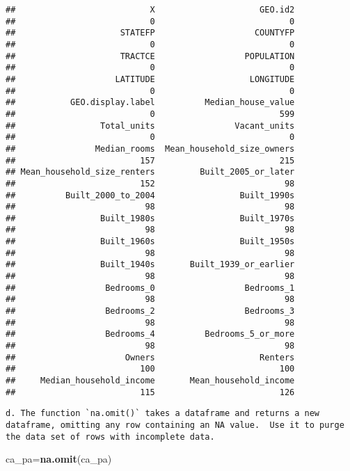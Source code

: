 \documentclass[
]{article}
\newenvironment{Shaded}{\begin{snugshade}}{\end{snugshade}}
\newcommand{\KeywordTok}[1]{\textcolor[rgb]{0.13,0.29,0.53}{\textbf{#1}}}
\newcommand{\NormalTok}[1]{#1}
\begin{document}
\begin{verbatim}
##                           X                     GEO.id2 
##                           0                           0 
##                     STATEFP                    COUNTYFP 
##                           0                           0 
##                     TRACTCE                  POPULATION 
##                           0                           0 
##                    LATITUDE                   LONGITUDE 
##                           0                           0 
##           GEO.display.label          Median_house_value 
##                           0                         599 
##                 Total_units                Vacant_units 
##                           0                           0 
##                Median_rooms  Mean_household_size_owners 
##                         157                         215 
## Mean_household_size_renters         Built_2005_or_later 
##                         152                          98 
##          Built_2000_to_2004                 Built_1990s 
##                          98                          98 
##                 Built_1980s                 Built_1970s 
##                          98                          98 
##                 Built_1960s                 Built_1950s 
##                          98                          98 
##                 Built_1940s       Built_1939_or_earlier 
##                          98                          98 
##                  Bedrooms_0                  Bedrooms_1 
##                          98                          98 
##                  Bedrooms_2                  Bedrooms_3 
##                          98                          98 
##                  Bedrooms_4          Bedrooms_5_or_more 
##                          98                          98 
##                      Owners                     Renters 
##                         100                         100 
##     Median_household_income       Mean_household_income 
##                         115                         126
\end{verbatim}

\begin{verbatim}
d. The function `na.omit()` takes a dataframe and returns a new dataframe, omitting any row containing an NA value.  Use it to purge the data set of rows with incomplete data.
\end{verbatim}

\begin{Shaded}
\begin{Highlighting}[]
\NormalTok{ca_pa=}\KeywordTok{na.omit}\NormalTok{(ca_pa)}
\end{Highlighting}
\end{Shaded}
\end{document}
